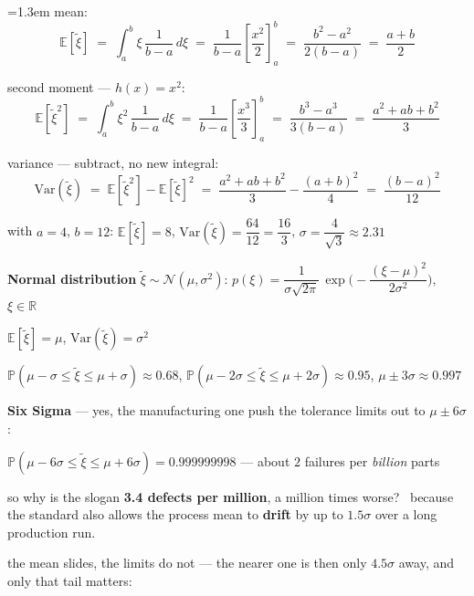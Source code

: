 \documentclass[10pt]{article}
\newenvironment{board}{%
  \par\vspace{4pt}
  \begingroup\leftskip=1.3em\relax\parskip=2pt\relax}{%
  \par\endgroup\vspace{4pt}}
\begin{document}
\begin{board}
\quad mean:
\[
\mathbb{E}[\tilde\xi] \;=\; \int_a^b \xi \, \frac{1}{b-a} \, d\xi
 \;=\; \frac{1}{b-a}\left[\frac{x^2}{2}\right]_a^b
 \;=\; \frac{b^2 - a^2}{2(b-a)} \;=\; \frac{a+b}{2}
\]

\quad second moment --- $h(x) = x^2$:
\[
\mathbb{E}[\tilde\xi^2] \;=\; \int_a^b \xi^2 \, \frac{1}{b-a} \, d\xi
 \;=\; \frac{1}{b-a}\left[\frac{x^3}{3}\right]_a^b
 \;=\; \frac{b^3 - a^3}{3(b-a)} \;=\; \frac{a^2 + ab + b^2}{3}
\]

\quad variance --- subtract, no new integral:
\[
\mathrm{Var}(\tilde\xi) \;=\; \mathbb{E}[\tilde\xi^2] - \mathbb{E}[\tilde\xi]^2
 \;=\; \frac{a^2 + ab + b^2}{3} - \frac{(a+b)^2}{4}
 \;=\; \frac{(b-a)^2}{12}
\]

\quad with $a = 4$, $b = 12$: \qquad
$\mathbb{E}[\tilde\xi] = 8$, \qquad
$\mathrm{Var}(\tilde\xi) = \dfrac{64}{12} = \dfrac{16}{3}$, \qquad
$\sigma = \dfrac{4}{\sqrt{3}} \approx 2.31$
\vspace{12pt}

\textbf{Normal distribution} \quad $\tilde\xi \sim \mathcal{N}(\mu, \sigma^2)$:
\qquad $p(\xi) = \dfrac{1}{\sigma\sqrt{2\pi}}\, \exp\!\Big(\!-\dfrac{(\xi-\mu)^2}{2\sigma^2}\Big)$, \ $\xi \in \mathbb{R}$
\vspace{4pt}

\quad $\mathbb{E}[\tilde\xi] = \mu$, \qquad $\mathrm{Var}(\tilde\xi) = \sigma^2$
\vspace{3pt}

\quad $\mathbb{P}(\mu - \sigma \le \tilde\xi \le \mu + \sigma) \approx 0.68$, \qquad
$\mathbb{P}(\mu - 2\sigma \le \tilde\xi \le \mu + 2\sigma) \approx 0.95$, \qquad
$\mu \pm 3\sigma \approx 0.997$
\vspace{10pt}

\textbf{Six Sigma} --- yes, the manufacturing one \quad push the tolerance limits out to $\mu \pm 6\sigma$:
\vspace{4pt}

\quad $\mathbb{P}(\mu - 6\sigma \le \tilde\xi \le \mu + 6\sigma) = 0.999999998$
\qquad --- about $2$ failures per \emph{billion} parts
\vspace{6pt}

\quad so why is the slogan \textbf{3.4 defects per million}, a million times worse? \ because the standard
      also allows the process mean to \textbf{drift} by up to $1.5\sigma$ over a long production run.
\vspace{3pt}

\quad the mean slides, the limits do not --- the nearer one is then only $4.5\sigma$ away, and only that tail matters:
\vspace{3pt}


\end{board}
\end{document}
